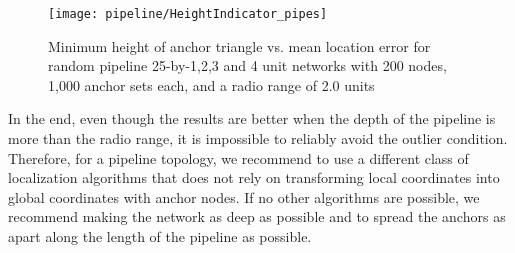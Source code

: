 \begin{figure}
  \centering
	\texttt{[image: pipeline/HeightIndicator\_pipes]}
	\caption[Minimum height of anchor triangle vs. mean location error]{Minimum height of anchor triangle vs. mean location error for random pipeline 25-by-1,2,3 and 4 unit networks with 200 nodes, 1,000 anchor sets each, and a radio range of 2.0 units}
	\label{fig:pipesheight}
\end{figure}

In the end, even though the results are better when the depth of the pipeline is more than the radio range, it is impossible to reliably avoid the outlier condition.  Therefore, for a pipeline topology, we recommend to use a different class of localization algorithms that does not rely on transforming local coordinates into global coordinates with anchor nodes.  If no other algorithms are possible, we recommend making the network as deep as possible and to spread the anchors as apart along the length of the pipeline as possible.  

